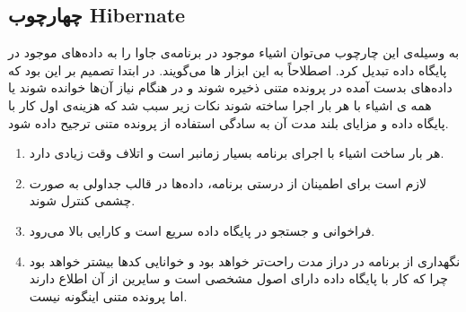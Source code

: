 \subsection{چهارچوب Hibernate }
به وسیله‌ی این چارچوب می‌توان  اشیاء موجود در برنامه‌ی جاوا را به داده‌های موجود در پایگاه داده تبدیل کرد. اصطلاحاً به این ابزار ها  می‌گویند. در ابتدا تصمیم بر این بود که داده‌های بدست آمده در پرونده متنی ذخیره شوند و در هنگام نیاز آن‌ها خوانده شوند یا همه ی اشیاء با هر بار اجرا ساخته شوند نکات زیر سبب شد که هزینه‌ی اول کار با پایگاه داده و مزایای بلند مدت آن به سادگی استفاده از پرونده متنی ترجیح داده شود.
\begin{enumerate}
\item	

هر بار ساخت اشیاء با اجرای برنامه بسیار زمانبر است و اتلاف وقت زیادی دارد.
\item
 لازم است برای اطمینان از درستی برنامه، داده‌ها در قالب جداولی به صورت چشمی کنترل شوند.
\item
 فراخوانی و جستجو در پایگاه داده سریع است و کارایی بالا می‌رود.
\item
نگهداری از برنامه در دراز مدت راحت‌تر خواهد بود و خوانایی کدها بیشتر خواهد بود چرا که کار با پایگاه داده دارای اصول مشخصی است و سایرین از آن اطلاع دارند اما پرونده متنی اینگونه نیست.
\end{enumerate}